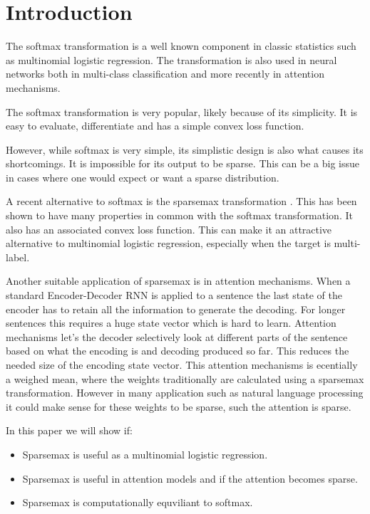 \section{Introduction}

The softmax transformation is a well known component in classic statistics such as multinomial logistic regression. The transformation is also used in neural networks both in multi-class classification and more recently in attention mechanisms.

The softmax transformation is very popular, likely because of its simplicity. It is easy to evaluate, differentiate and has a simple convex loss function.

However, while softmax is very simple, its simplistic design is also what causes its shortcomings. It is impossible for its output to be sparse. This can be a big issue in cases where one would expect or want a sparse distribution.

A recent alternative to softmax is the sparsemax transformation \cite{sparsemax}. This has been shown to have many properties in common with the softmax transformation. It also has an associated convex loss function. This can make it an attractive alternative to multinomial logistic regression, especially when the target is multi-label.

Another suitable application of sparsemax is in attention mechanisms. When a standard Encoder-Decoder RNN is applied to a sentence the last state of the encoder has to retain all the information to generate the decoding. For longer sentences this requires a huge state vector which is hard to learn. Attention mechanisms let's the decoder selectively look at different parts of the sentence based on what the encoding is and decoding produced so far. This reduces the needed size of the encoding state vector. This attention mechanisms is ecentially a weighed mean, where the weights traditionally are calculated using a sparsemax transformation. However in many application such as natural language processing it could make sense for these weights to be sparse, such the attention is sparse.

In this paper we will show if:
\begin{itemize}
\item Sparsemax is useful as a multinomial logistic regression.
\item Sparsemax is useful in attention models and if the attention becomes sparse.
\item Sparsemax is computationally equviliant to softmax.
\end{itemize}
